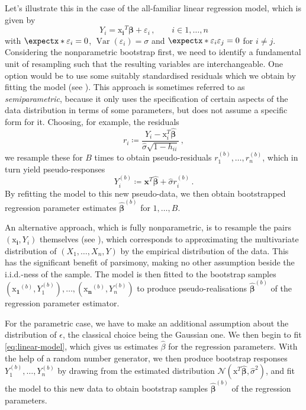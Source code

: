 \documentclass[a4paper]{book}
\begin{document}
Let's illustrate this in the case of the all-familiar linear regression model, which is given by
\begin{equation} \label{eq:linear-model}
    Y_i = \bm{\mathrm{x}_i}^T \bm{\beta} + \varepsilon_i \,, \qquad i \in {1, \dots, n}
\end{equation}
with $\expect{\varepsilon_i} = 0$, $\operatorname{Var}(\varepsilon_i) = \sigma$ and $\expect{\varepsilon_i \varepsilon_j} = 0$ for $i \neq j$. Considering the nonparametric bootstrap first, we need to identify a fundamental unit of resampling such that the resulting variables are interchangeable. One option would be to use some suitably standardised residuals which we obtain by fitting the model (see \cite[Algorithm 6.1]{davison}). This approach is sometimes referred to as \emph{semiparametric}, because it only uses the specification of certain aspects of the data distribution in terms of some parameters, but does not assume a specific form for it. Choosing, for example, the residuals
\begin{equation}
    r_i \coloneqq \frac{Y_i - \bm{\mathrm{x}}^T_i \widehat{\bm{\beta}}}{\widehat{\sigma} \sqrt{1 - h_{ii}}} \,,
\end{equation}
we resample these for $B$ times to obtain pseudo-residuals $r^{(b)}_1, \dots, r^{(b)}_n$, which in turn yield  pseudo-responses
\begin{equation}
    Y_i^{(b)} \coloneqq \mathbf{x}^T \widehat{\bm{\beta}} + \widehat{\sigma} r^{(b)}_i \,.
\end{equation}
By refitting the model to this new pseudo-data, we then obtain bootstrapped regression parameter estimates $\widehat{\bm{\beta}}^{(b)}$ for $1, \dots, B$. 

An alternative approach, which is fully nonparametric, is to resample the pairs $(\bm{\mathrm{x}_i}, Y_i)$ themselves (see \cites[Section 9.5]{efron:intro}[Algorithm 6.2]{davison}), which corresponds to approximating the multivariate distribution of $(X_1, \dots, X_n, Y)$ by the empirical distribution of the data. This has the significant benefit of parsimony, making no other assumption beside the i.i.d.-ness of the sample. The model is then fitted to the bootstrap samples $(\bm{\mathrm{x}_1}^{(b)}, Y^{(b)}_1), \dots, (\bm{\mathrm{x}_n}^{(b)}, Y^{(b)}_n)$ to produce pseudo-realisations $\widehat{\bm{\beta}}^{(b)}$ of the regression parameter estimator.

For the parametric case, we have to make an additional assumption about the distribution of $\epsilon$, the classical choice being the Gaussian one. We then begin to fit \cref{eq:linear-model}, which gives us estimates $\widehat{\beta}$ for the regression parameters. With the help of a random number generator, we then produce bootstrap responses $Y^{(b)}_1, \dots, Y^{(b)}_n$ by drawing from the estimated distribution $\mathcal{N}(\bm{\mathrm{x}}^T \widehat{\bm{\beta}}, \widehat{\sigma}^2)$, and fit the model to this new data to obtain bootstrap samples $\widehat{\bm{\beta}}^{(b)}$ of the regression parameters.
\end{document}

